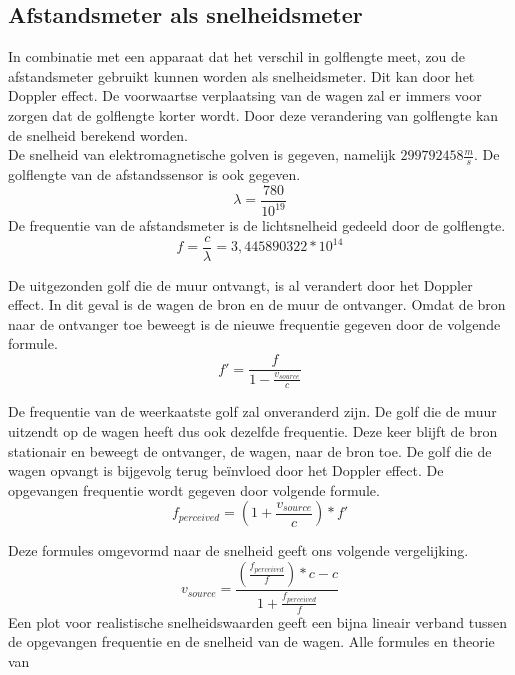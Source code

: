  

\subsection{Afstandsmeter als snelheidsmeter}
In combinatie met een apparaat dat het verschil in golflengte meet, zou de afstandsmeter gebruikt kunnen worden als snelheidsmeter. Dit kan door het Doppler effect. De voorwaartse verplaatsing van de wagen zal er immers voor zorgen dat de golflengte korter wordt. Door deze verandering van golflengte kan de snelheid berekend worden.\\

De snelheid van elektromagnetische golven is gegeven, namelijk $299792458 \frac{m}{s}$. De golflengte van de afstandssensor is ook gegeven. $$\lambda = \frac{780}{10^{19}}$$
De frequentie van de afstandsmeter is de lichtsnelheid gedeeld door de golflengte.
\begin{equation}
f=\frac{c}{\lambda}=3,445890322*10^{14}
\end{equation}

De uitgezonden golf die de muur ontvangt, is al verandert door het Doppler effect. In dit geval is de wagen de bron en de muur de ontvanger. Omdat de bron naar de ontvanger toe beweegt is de nieuwe frequentie gegeven door de volgende formule.
\begin{equation}
f'=\frac{f}{1-\frac{v_{source}}{c}}
\end{equation}

De frequentie van de weerkaatste golf zal onveranderd zijn. De golf die de muur uitzendt op de wagen heeft dus ook dezelfde frequentie. Deze keer blijft de bron stationair en beweegt de ontvanger, de wagen, naar de bron toe. De golf die de wagen opvangt is bijgevolg terug beïnvloed door het Doppler effect. De opgevangen frequentie wordt gegeven door volgende formule.
\begin{equation}
f_{perceived}=\left(1+\frac{v_{source}}{c}\right)*f'
\end{equation}

Deze formules omgevormd naar de snelheid geeft ons volgende vergelijking.
\begin{equation}
v_{source} = \frac{\left(\frac{f_{perceived}}{f}\right)*c-c}{1+\frac{f_{perceived}}{f}}
\end{equation}
Een plot voor realistische snelheidswaarden geeft een bijna lineair verband tussen de opgevangen frequentie en de snelheid van de wagen.
Alle formules en theorie van 
